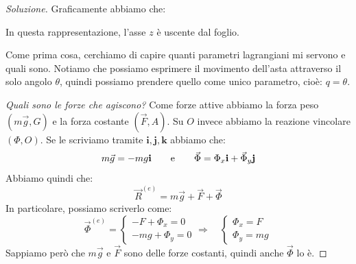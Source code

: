 \documentclass[11pt,a4paper,twoside]{article}
\theoremstyle{definition}
\newenvironment{sol}
	{\renewcommand\qedsymbol{$\blacksquare$}\begin{proof}[Soluzione]}
	{\end{proof}}
\begin{document}
\begin{sol}
	Graficamente abbiamo che:
	\begin{center}
	\end{center}
	In questa rappresentazione, l'asse $z$ è uscente dal foglio.

	Come prima cosa, cerchiamo di capire quanti parametri lagrangiani mi servono e quali sono. Notiamo che possiamo esprimere il movimento dell'asta attraverso il solo angolo $\theta$, quindi possiamo prendere quello come unico parametro, cioè: $q = \theta$.

	\textit{Quali sono le forze che agiscono?} Come forze attive abbiamo la forza peso $(m\vec g, G)$ e la forza costante $(\vec F, A)$. Su $O$ invece abbiamo la reazione vincolare $(\Phi, O)$. Se le scriviamo tramite $\mathbf i, \mathbf j, \mathbf k$ abbiamo che:
	\[ m\vec g = -mg \mathbf i \qquad \text e \qquad \vec \Phi = \Phi_x \mathbf i + \vec \Phi_y \mathbf j \]
	Abbiamo quindi che:
	\[ \vec R^{(e)} = m \vec g + \vec F+ \vec \Phi \]
	In particolare, possiamo scriverlo come:
	\[ \vec \Phi^{(e)} = \begin{cases}
		-F + \Phi_x = 0\\ -mg + \Phi_y = 0
		\end{cases} \Rightarrow \quad \begin{cases}
			\Phi_x = F\\ \Phi_y = mg
		\end{cases}
	\]
	Sappiamo però che $m\vec g$ e $\vec F$ sono delle forze costanti, quindi anche $\vec \Phi$ lo è.


\end{sol}
\end{document}
